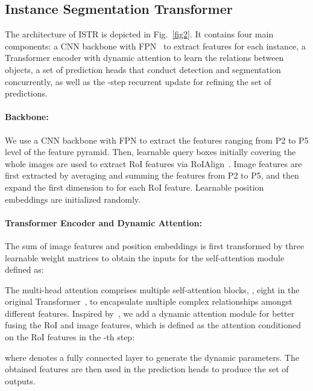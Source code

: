 \documentclass[10pt,twocolumn,letterpaper]{article}
\begin{document}
\subsection{Instance Segmentation Transformer}
\label{sec3.3}
The architecture of ISTR is depicted in Fig.~\ref{fig2}. It contains four main components: a CNN backbone with FPN~\cite{lin2017feature} to extract features for each instance, a Transformer encoder with dynamic attention to learn the relations between objects, a set of prediction heads that conduct detection and segmentation concurrently, as well as the -step recurrent update for refining the set of predictions.
\paragraph{Backbone:} We use a CNN backbone with FPN to extract the features ranging from P2 to P5 level of the feature pyramid.
Then,  learnable query boxes  initially covering the whole images are used to extract  RoI features  via RoIAlign~\cite{he2017mask}.
Image features  are first extracted by averaging and summing the features from P2 to P5, and then expand the first dimension to  for each RoI feature.
Learnable position embeddings  are initialized randomly.
\paragraph{Transformer Encoder and Dynamic Attention:} The sum of image features and position embeddings is first transformed by three learnable weight matrices to obtain the inputs  for the self-attention module defined as:

The multi-head attention comprises multiple self-attention blocks, \eg, eight in the original Transformer~\cite{vaswani2017attention}, to encapsulate multiple complex relationships amongst different features.
Inspired by~\cite{sun2020sparse}, we add a dynamic attention module for better fusing the RoI and image features, which is defined as the attention conditioned on the RoI features  in the -th step:

where  denotes a fully connected layer to generate the dynamic parameters.
The obtained features  are then used in the prediction heads to produce the set of outputs.
\end{document}

